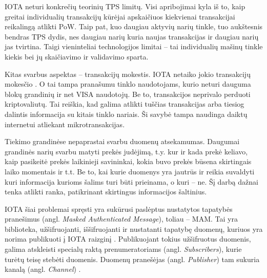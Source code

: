 IOTA neturi konkrečių teorinių TPS limitų. Visi apribojimai kyla iš to, kaip greitai individualių transakcijų kūrėjai apskaičiuos kiekvienai transakcijai reikalingą atlikti PoW. Taip pat, kuo daugiau aktyvių narių tinkle, tuo aukštesnis bendras TPS dydis, nes daugiau narių kuria naujas transakcijas ir daugiau narių jas tvirtina. Taigi vieninteliai technologijos limitai – tai individualių mašinų tinkle kiekis bei jų skaičiavimo ir validavimo sparta.

Kitas svarbus aspektas – transakcijų mokestis. IOTA netaiko jokio transakcijų mokesčio \cite{zivic2019distributed}. O tai tampa pranašumu tinklo naudotojams, kurio neturi dauguma blokų grandinių ir net VISA naudotojų. Be to, transakcijos neprivalo perduoti kriptovaliutų. Tai reiškia, kad galima atlikti tuščias transakcijas arba tiesiog dalintis informacija su kitais tinklo nariais. Ši savybė tampa naudinga daiktų internetui atliekant mikrotransakcijas.





Tiekimo grandinėse nepaprastai svarbu duomenų atsekamumas. Daugumai grandinės narių svarbu matyti prekės judėjimą, t.y. kur ir kada prekė keliavo, kaip pasikeitė prekės laikinieji savininkai, kokia buvo prekės būsena skirtingais laiko momentais ir t.t. Be to, kai kurie duomenys yra jautrūs ir reikia suvaldyti kuri informacija kurioms šalims turi būti prieinama, o kuri – ne. Šį darbą dažnai tenka atlikti ranka, patikrinant skirtingus informacijos šaltinius.

IOTA šiai problemai spręsti yra sukūrusi paslėptus nustatytos tapatybės pranešimus (angl. \textit{Masked Authenticated Message}), toliau – MAM. Tai yra biblioteka, užšifruojanti, iššifruojanti ir nustatanti tapatybę duomenų, kuriuos yra norima publikuoti į IOTA raizginį \cite{andreas2017masked}. Publikuojant tokius užšifruotus duomenis, galima atskleisti specialų raktą prenumeratoriams (angl. \textit{Subscribers}), kurie turėtų teisę stebėti duomenis. Duomenų pranešėjas (angl. \textit{Publisher}) tam sukuria kanalą (angl. \textit{Channel}) \cite{ab2018iota}.

